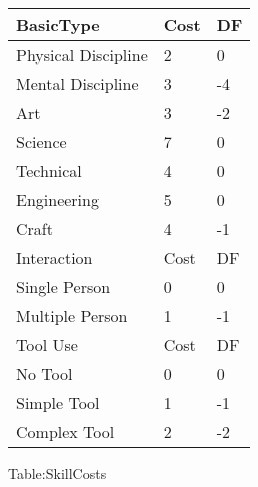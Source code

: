 
\begin{SHTable}[h]
	\begin{tabular}{lll}
    BasicType           & Cost          & DF \\
	\hline
    Physical Discipline            &  2          &  0 \\
    Mental Discipline              &  3           & -4 \\
    Art                            &  3           & -2 \\
    Science                        &  7          &  0 \\
    Technical                      &  4          &  0 \\
    Engineering                    &  5          &  0 \\
    Craft                          &  4           & -1 \\
	\hline
    Interaction                    & Cost          & DF \\
	\hline
    Single Person                  &  0          &  0 \\
    Multiple Person                &  1           & -1 \\
	\hline
    Tool Use                       & Cost          & DF \\
	\hline
    No Tool                        &  0          &  0 \\
    Simple Tool                    &  1           & -1 \\
    Complex Tool                   &  2           & -2 \\
    \end{tabular}
    \caption{Table:SkillCosts}
\end{SHTable}



